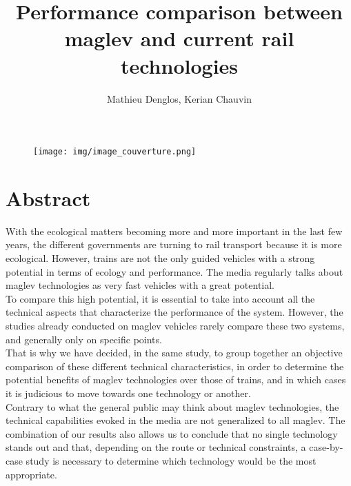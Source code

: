 \documentclass[12pt, a4paper, onecolumn]{article}
\title{Performance comparison between maglev and current rail technologies}
\author{Mathieu Denglos, Kerian Chauvin}
\date{}
\renewcommand{\tab}{\tabto{15px}}
\begin{document}
\maketitle  %

\begin{figure}[H] %
  \centering
  \scalebox{0.28}
  {\texttt{[image: img/image\_couverture.png]}}
\end{figure}



\pagebreak %
\section*{Abstract} %
\tab With the ecological matters becoming more and more important in the last few years, the different governments are turning to rail transport because it is more ecological.
However, trains are not the only guided vehicles with a strong potential in terms of ecology and performance.
The media regularly talks about maglev technologies as very fast vehicles with a great potential.\\
\tab To compare this high potential, it is essential to take into account all the technical aspects that characterize the performance of the system.
However, the studies already conducted on maglev vehicles rarely compare these two systems, and generally only on specific points. \\
\linebreak
\tab That is why we have decided, in the same study, to group together an objective comparison of these different technical characteristics, in order to determine the potential benefits of maglev technologies over those of trains, and in which cases it is judicious to move towards one technology or another. \\
\linebreak
\tab Contrary to what the general public may think about maglev technologies, the technical capabilities evoked in the media are not generalized to all maglev.
The combination of our results also allows us to conclude that no single technology stands out and that, depending on the route or technical constraints, a case-by-case study is necessary to determine which technology would be the most appropriate. \\
\end{document}
